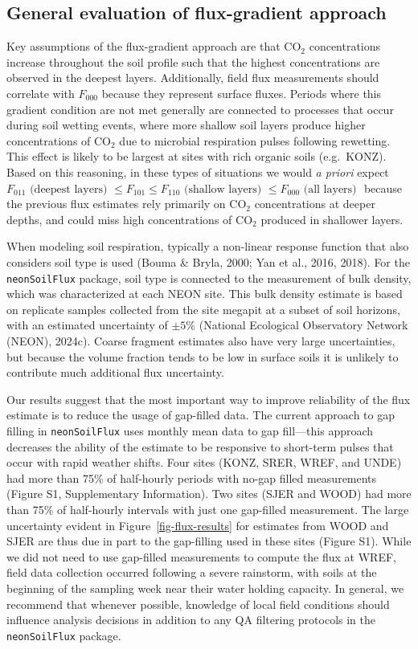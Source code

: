 \documentclass[
  letterpaper,
  DIV=11,
  numbers=noendperiod]{scrartcl}
\begin{document}
\subsection{General evaluation of flux-gradient
approach}\label{sec-general-eval}

Key assumptions of the flux-gradient approach are that CO\(_{2}\)
concentrations increase throughout the soil profile such that the
highest concentrations are observed in the deepest layers. Additionally,
field flux measurements should correlate with \(F_{000}\) because they
represent surface fluxes. Periods where this gradient condition are not
met generally are connected to processes that occur during soil wetting
events, where more shallow soil layers produce higher concentrations of
CO\(_{2}\) due to microbial respiration pulses following rewetting. This
effect is likely to be largest at sites with rich organic soils
(e.g.~KONZ). Based on this reasoning, in these types of situations we
would \emph{a priori} expect
\(F_{011} \mbox{ (deepest layers) } \leq F_{101} \leq F_{110} \mbox{ (shallow layers) } \leq F_{000} \mbox{ (all layers) }\)
because the previous flux estimates rely primarily on CO\(_2\)
concentrations at deeper depths, and could miss high concentrations of
CO\(_{2}\) produced in shallower layers.

When modeling soil respiration, typically a non-linear response function
that also considers soil type is used (Bouma \& Bryla, 2000; Yan et al.,
2016, 2018). For the \texttt{neonSoilFlux} package, soil type is
connected to the measurement of bulk density, which was characterized at
each NEON site. This bulk density estimate is based on replicate samples
collected from the site megapit at a subset of soil horizons, with an
estimated uncertainty of \(\pm5\%\) (National Ecological Observatory
Network (NEON), 2024c). Coarse fragment estimates also have very large
uncertainties, but because the volume fraction tends to be low in
surface soils it is unlikely to contribute much additional flux
uncertainty.

Our results suggest that the most important way to improve reliability
of the flux estimate is to reduce the usage of gap-filled data. The
current approach to gap filling in \texttt{neonSoilFlux} uses monthly
mean data to gap fill---this approach decreases the ability of the
estimate to be responsive to short-term pulses that occur with rapid
weather shifts. Four sites (KONZ, SRER, WREF, and UNDE) had more than
75\% of half-hourly periods with no-gap filled measurements (Figure S1,
Supplementary Information). Two sites (SJER and WOOD) had more than 75\%
of half-hourly intervals with just one gap-filled measurement. The large
uncertainty evident in Figure~\ref{fig-flux-results} for estimates from
WOOD and SJER are thus due in part to the gap-filling used in these
sites (Figure S1). While we did not need to use gap-filled measurements
to compute the flux at WREF, field data collection occurred following a
severe rainstorm, with soils at the beginning of the sampling week near
their water holding capacity. In general, we recommend that whenever
possible, knowledge of local field conditions should influence analysis
decisions in addition to any QA filtering protocols in the
\texttt{neonSoilFlux} package.
\end{document}

